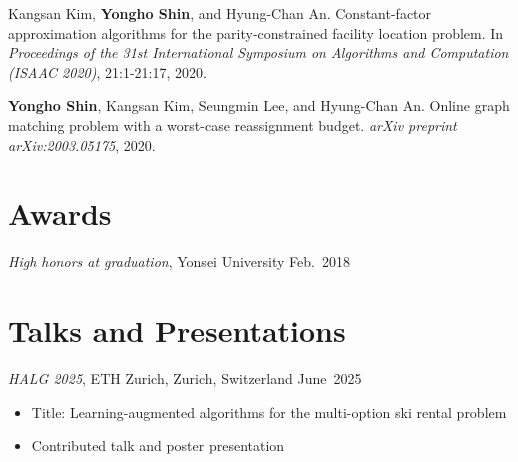 \documentclass{article}
\newcommand{\killinitspace}{-0.7em}
\begin{document}
Kangsan Kim, \textbf{Yongho Shin}, and Hyung-Chan An. Constant-factor approximation algorithms for the parity-constrained facility location problem. In \emph{Proceedings of the 31st International Symposium on Algorithms and Computation (ISAAC 2020)}, 21:1-21:17, 2020.

\textbf{Yongho Shin}, Kangsan Kim, Seungmin Lee, and Hyung-Chan An. Online graph matching problem with a worst-case reassignment budget. \emph{arXiv preprint arXiv:2003.05175}, 2020.

\section{Awards}
\textsl{High honors at graduation}, Yonsei University \hfill Feb.~2018

\section{Talks and Presentations}
\textsl{HALG 2025}, ETH Zurich, Zurich, Switzerland \hfill June~2025
\vspace{\killinitspace}
\begin{itemize}
\item Title: Learning-augmented algorithms for the multi-option ski rental problem
\item Contributed talk and poster presentation
\end{itemize}
\end{document}
